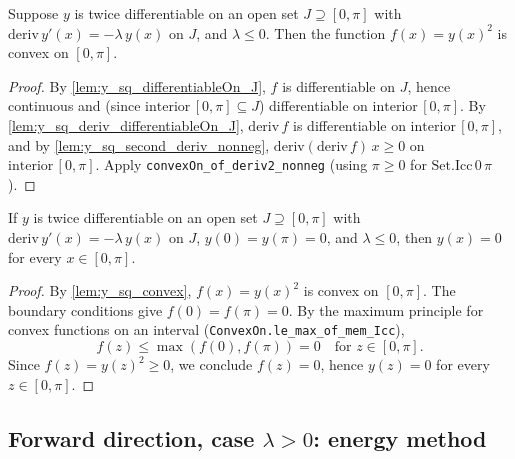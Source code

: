 \begin{lemma}
    \label{lem:y_sq_convex}
    \leanok
    Suppose $y$ is twice differentiable on an open set $J \supseteq [0,\pi]$
    with $\mathrm{deriv}\, y'(x) = -\lambda \, y(x)$ on $J$, and $\lambda \le 0$.
    Then the function $f(x) = y(x)^2$ is convex on $[0,\pi]$.
\end{lemma}
\begin{proof}
    By \cref{lem:y_sq_differentiableOn_J}, $f$ is differentiable on $J$, hence
    continuous and (since $\mathrm{interior}\,[0,\pi] \subseteq J$) differentiable
    on $\mathrm{interior}\,[0,\pi]$. By \cref{lem:y_sq_deriv_differentiableOn_J},
    $\mathrm{deriv}\, f$ is differentiable on $\mathrm{interior}\,[0,\pi]$, and by
    \cref{lem:y_sq_second_deriv_nonneg}, $\mathrm{deriv}(\mathrm{deriv}\, f)\, x
    \ge 0$ on $\mathrm{interior}\,[0,\pi]$. Apply
    \texttt{convexOn\_of\_deriv2\_nonneg} (using $\pi \ge 0$ for $\mathrm{Set.Icc}\, 0\, \pi$).
\end{proof}

\begin{lemma}[No eigenvalue $\le 0$]
    \label{lem:no_eigen_nonpos}
    \leanok
    If $y$ is twice differentiable on an open set $J \supseteq [0,\pi]$ with
    $\mathrm{deriv}\, y'(x) = -\lambda \, y(x)$ on $J$, $y(0) = y(\pi) = 0$, and
    $\lambda \le 0$, then $y(x) = 0$ for every $x \in [0,\pi]$.
\end{lemma}
\begin{proof}
    By \cref{lem:y_sq_convex}, $f(x) = y(x)^2$ is convex on $[0,\pi]$. The
    boundary conditions give $f(0) = f(\pi) = 0$. By the maximum principle for
    convex functions on an interval (\texttt{ConvexOn.le\_max\_of\_mem\_Icc}),
    \[ f(z) \le \max(f(0), f(\pi)) = 0 \quad \text{for } z \in [0,\pi]. \]
    Since $f(z) = y(z)^2 \ge 0$, we conclude $f(z) = 0$, hence $y(z) = 0$ for
    every $z \in [0,\pi]$.
\end{proof}

\subsection{Forward direction, case $\lambda > 0$: energy method}

